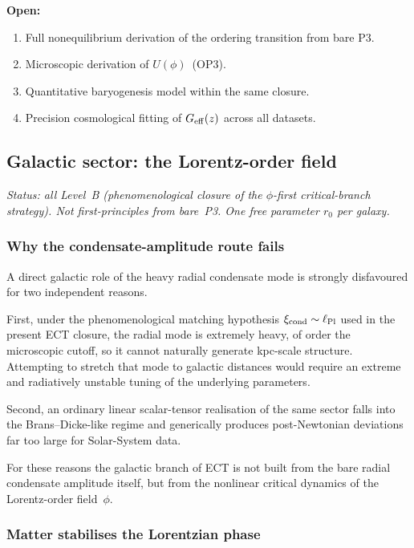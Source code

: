 \textbf{Open:}
\begin{enumerate}[label=(\roman*)]
  \item Full nonequilibrium derivation of the ordering transition from
    bare P3.
  \item Microscopic derivation of $U(\phi)$~(OP3).
  \item Quantitative baryogenesis model within the same closure.
  \item Precision cosmological fitting of $G_{\rm eff}(z)$ across
    all datasets.
\end{enumerate}


\subsection{Galactic sector: the Lorentz-order field}
\label{sec:mp_galactic}

\textit{Status: all Level~B (phenomenological closure of the
$\phi$-first critical-branch strategy). Not first-principles from
bare~P3. One free parameter $r_0$ per galaxy.}

\subsubsection*{Why the condensate-amplitude route fails}

A direct galactic role of the heavy radial condensate mode is strongly
disfavoured for two independent reasons.

First, under the phenomenological matching hypothesis
$\xi_{\rm cond}\sim\ell_{\rm Pl}$ used in the present ECT closure,
the radial mode is extremely heavy, of order the microscopic cutoff,
so it cannot naturally generate kpc-scale structure.
Attempting to stretch that mode to galactic distances would require an
extreme and radiatively unstable tuning of the underlying parameters.

Second, an ordinary linear scalar-tensor realisation of the same
sector falls into the Brans--Dicke-like regime and generically produces
post-Newtonian deviations far too large for Solar-System data.

For these reasons the galactic branch of ECT is not built from the bare
radial condensate amplitude itself, but from the nonlinear critical
dynamics of the Lorentz-order field~$\phi$.

\subsubsection*{Matter stabilises the Lorentzian phase}

